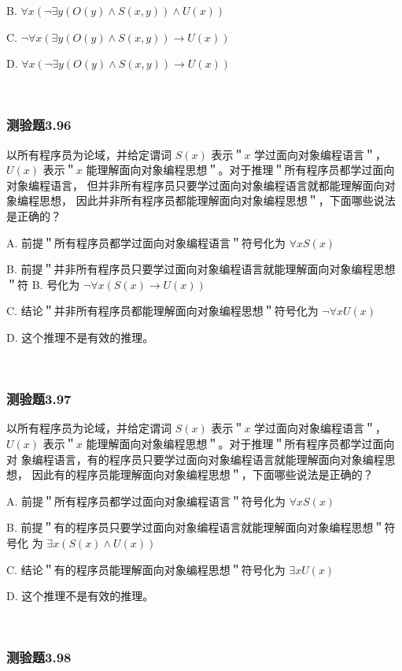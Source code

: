 \documentclass[UTF8, heading=true]{ctexart}
\begin{document}
B. $
\forall x(\neg \exists y(O(y) \wedge S(x, y)) \wedge U(x))
$


C. $
\neg \forall x(\exists y(O(y) \wedge S(x, y)) \rightarrow U(x))
$


D. $
\forall x(\neg \exists y(O(y) \wedge S(x, y)) \rightarrow U(x))
$

\textcolor{white}{答案：C}

\subsubsection{测验题3.96}

以所有程序员为论域，并给定谓词 $S(x)$ 表示＂$x$ 学过面向对象编程语言＂，$U(x)$ 表示＂$x$ 
能理解面向对象编程思想＂。对于推理＂所有程序员都学过面向对象编程语言，
但并非所有程序员只要学过面向对象编程语言就都能理解面向对象编程思想，
因此并非所有程序员都能理解面向对象编程思想＂，下面哪些说法是正确的？

A. 前提＂所有程序员都学过面向对象编程语言＂符号化为 $\forall x S(x)$

B. 前提＂并非所有程序员只要学过面向对象编程语言就能理解面向对象编程思想＂符 B. 号化为 $\neg \forall x(S(x) \rightarrow U(x))$

C. 结论＂并非所有程序员都能理解面向对象编程思想＂符号化为 $\neg \forall x U(x)$

D.  这个推理不是有效的推理。

\textcolor{white}{答案：ABC}

\subsubsection{测验题3.97}

以所有程序员为论域，并给定谓词 $S(x)$ 表示＂$x$ 学过面向对象编程语言＂，$U(x)$ 
表示＂$x$ 能理解面向对象编程思想＂。对于推理＂所有程序员都学过面向对
象编程语言，有的程序员只要学过面向对象编程语言就能理解面向对象编程思想，
因此有的程序员能理解面向对象编程思想＂，下面哪些说法是正确的？

A. 前提＂所有程序员都学过面向对象编程语言＂符号化为 $\forall x S(x)$

B. 前提＂有的程序员只要学过面向对象编程语言就能理解面向对象编程思想＂符号化
为 $\exists x(S(x) \wedge U(x))$

C. 结论＂有的程序员能理解面向对象编程思想＂符号化为 $\exists x U(x)$

D. 这个推理不是有效的推理。

\textcolor{white}{答案：AC}

\subsubsection{测验题3.98}
\end{document}
